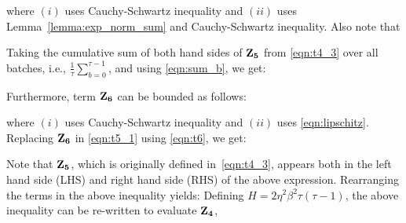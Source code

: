 where $(i)$ uses Cauchy-Schwartz inequality and $(ii)$ uses Lemma~\ref{lemma:exp_norm_sum} and Cauchy-Schwartz inequality. Also note that

Taking the cumulative sum of both hand sides of ${\bf Z_5}$ from \eqref{eqn:t4_3} over all batches, i.e., $\frac{1}{\tau}\sum_{b=0}^{\tau-1}$, and using \eqref{eqn:sum_b}, we get:

Furthermore, term ${\bf Z_6}$ can be bounded as follows:

where $(i)$ uses Cauchy-Schwartz inequality and $(ii)$ uses \eqref{eqn:lipschitz}. Replacing ${\bf Z_6}$ in \eqref{eqn:t5_1} using \eqref{eqn:t6},  we get:

Note that ${\bf Z_5}$, which is originally defined in~\eqref{eqn:t4_3}, appears both in the left hand side (LHS) and right hand side (RHS) of the above expression. Rearranging the terms in the above inequality yields:
Defining $H=2\eta^2\beta^2\tau(\tau-1)$, the above inequality can be re-written to evaluate ${\bf Z_4}$,


